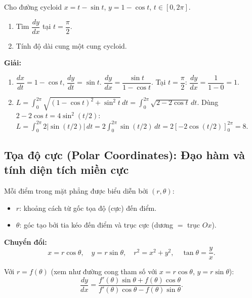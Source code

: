 \documentclass[12pt,a4paper]{article}
\begin{document}
\begin{vidu}
  Cho đường cycloid $x = t - \sin t$, $y = 1 - \cos t$, $t \in [0, 2\pi]$.
  \begin{enumerate}[label=(\alph*)]
    \item Tìm $\dfrac{dy}{dx}$ tại $t = \dfrac{\pi}{2}$.
    \item Tính độ dài cung một cung cycloid.
  \end{enumerate}

  \medskip\textbf{Giải:}
  \begin{enumerate}[label=(\alph*)]
    \item $\dfrac{dx}{dt} = 1 - \cos t$, $\dfrac{dy}{dt} = \sin t$.
      $\dfrac{dy}{dx} = \dfrac{\sin t}{1 - \cos t}$.
      Tại $t = \dfrac{\pi}{2}$: $\dfrac{dy}{dx} = \dfrac{1}{1-0} = 1$.

    \item $L = \displaystyle\int_0^{2\pi} \sqrt{(1-\cos t)^2 + \sin^2 t}\,dt = \int_0^{2\pi} \sqrt{2 - 2\cos t}\,dt$.
      Dùng $2-2\cos t = 4\sin^2(t/2)$:
      $L = \displaystyle\int_0^{2\pi} 2|\sin(t/2)|\,dt = 2\int_0^{2\pi} \sin(t/2)\,dt = 2\left[-2\cos(t/2)\right]_0^{2\pi} = 8$.
  \end{enumerate}
\end{vidu}

\subsection{Tọa độ cực (Polar Coordinates): Đạo hàm và tính diện tích miền cực}

\begin{dinhnghia}[title={Tọa độ cực}]
  Mỗi điểm trong mặt phẳng được biểu diễn bởi $(r, \theta)$:
  \begin{itemize}
    \item $r$: khoảng cách từ gốc tọa độ (cực) đến điểm.
    \item $\theta$: góc tạo bởi tia kéo đến điểm và trục cực (dương $= $ trục $Ox$).
  \end{itemize}

  \textbf{Chuyển đổi:}
  \[
    x = r\cos\theta, \quad y = r\sin\theta, \quad r^2 = x^2 + y^2, \quad \tan\theta = \frac{y}{x}.
  \]
\end{dinhnghia}

\begin{congthuc}[title={Đạo hàm trong tọa độ cực}]
  Với $r = f(\theta)$ (xem như đường cong tham số với $x = r\cos\theta$, $y = r\sin\theta$):
  \[
    \frac{dy}{dx} = \frac{f'(\theta)\sin\theta + f(\theta)\cos\theta}{f'(\theta)\cos\theta - f(\theta)\sin\theta}.
  \]
\end{congthuc}
\end{document}

